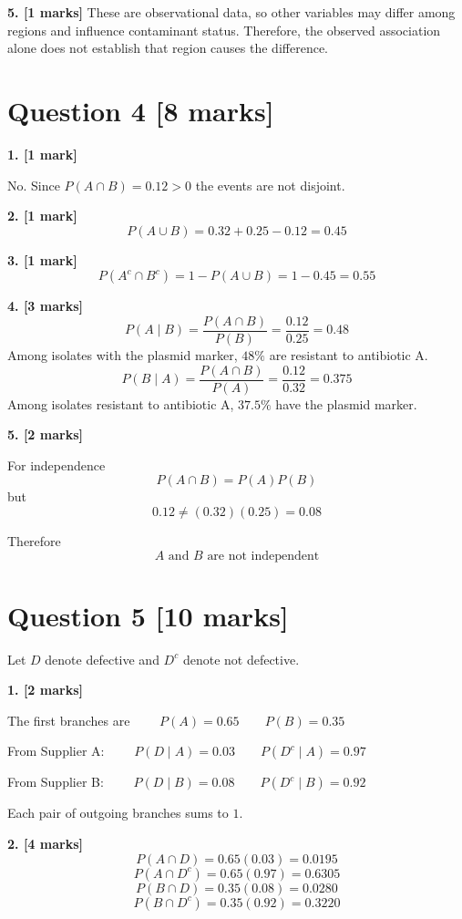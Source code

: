 \documentclass[10pt,letterpaper]{article}
\begin{document}
\textbf{5. [1 marks]}
These are observational data, so other variables may differ among regions and influence contaminant status. Therefore, the observed association alone does not establish that region causes the difference.

\section*{Question 4 \hfill [8 marks]}

\textbf{1. [1 mark]}

No. Since $P(A\cap B)=0.12>0$ the events are not disjoint.

\textbf{2. [1 mark]}
$$P(A\cup B)=0.32+0.25-0.12=\boxed{0.45}$$

\textbf{3. [1 mark]}
$$P(A^c\cap B^c)=1-P(A\cup B)=1-0.45=\boxed{0.55}$$

\textbf{4. [3 marks]}
$$P(A\mid B)=\frac{P(A\cap B)}{P(B)}=\frac{0.12}{0.25}=\boxed{0.48}$$
Among isolates with the plasmid marker, \(48\%\) are resistant to antibiotic A.
$$P(B\mid A)=\frac{P(A\cap B)}{P(A)}=\frac{0.12}{0.32}=\boxed{0.375}$$
Among isolates resistant to antibiotic A, \(37.5\%\) have the plasmid marker.

\textbf{5. [2 marks]}

For independence
$$P(A\cap B)=P(A)P(B)$$
but
$$0.12\ne(0.32)(0.25)=0.08$$

Therefore
$$\boxed{A\text{ and }B\text{ are not independent}}$$

\section*{Question 5 \hfill [10 marks]}

Let \(D\) denote defective and \(D^c\) denote not defective.

\textbf{1. [2 marks]}

The first branches are $\qquad P(A)=0.65 \qquad P(B)=0.35$

From Supplier A: $\qquad P(D\mid A)=0.03 \qquad P(D^c\mid A)=0.97$

From Supplier B: $\qquad P(D\mid B)=0.08 \qquad P(D^c\mid B)=0.92$

Each pair of outgoing branches sums to \(1\).

\textbf{2. [4 marks]}
$$P(A\cap D)=0.65(0.03)=\boxed{0.0195}$$
$$P(A\cap D^c)=0.65(0.97)=\boxed{0.6305}$$
$$P(B\cap D)=0.35(0.08)=\boxed{0.0280}$$
$$P(B\cap D^c)=0.35(0.92)=\boxed{0.3220}$$
\end{document}
